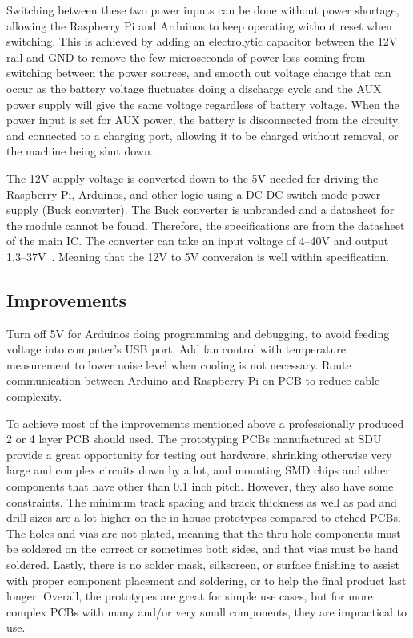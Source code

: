 \documentclass[11pt]{article}
\begin{document}
Switching between these two power inputs can be done without power shortage, allowing the Raspberry Pi and Arduinos to keep operating without reset when switching. This is achieved by adding an electrolytic capacitor between the 12V rail and GND to remove the few microseconds of power loss coming from switching between the power sources, and smooth out voltage change that can occur as the battery voltage fluctuates doing a discharge cycle and the AUX power supply will give the same voltage regardless of battery voltage. When the power input is set for AUX power, the battery is disconnected from the circuity, and connected to a charging port, allowing it to be charged without removal, or the machine being shut down.


The 12V supply voltage is converted down to the 5V needed for driving the Raspberry Pi, Arduinos, and other logic using a DC-DC switch mode power supply (Buck converter). The Buck converter is unbranded and a datasheet for the module cannot be found. Therefore, the specifications are from the datasheet of the main IC. The converter can take an input voltage of 4--40V and output 1.3--37V~\cite{LM2596-datasheet}. Meaning that the 12V to 5V conversion is well within specification. 

\subsection*{Improvements}


Turn off 5V for Arduinos doing programming and debugging, to avoid feeding voltage into computer's USB port. Add fan control with temperature measurement to lower noise level when cooling is not necessary. Route communication between Arduino and Raspberry Pi on PCB to reduce cable complexity.


To achieve most of the improvements mentioned above a professionally produced 2 or 4 layer PCB should used. The prototyping PCBs manufactured at SDU provide a great opportunity for testing out hardware, shrinking otherwise very large and complex circuits down by a lot, and mounting SMD chips and other components that have other than 0.1 inch pitch. However, they also have some constraints. The minimum track spacing and track thickness as well as pad and drill sizes are a lot higher on the in-house prototypes compared to etched PCBs. The holes and vias are not plated, meaning that the thru-hole components must be soldered on the correct or sometimes both sides, and that vias must be hand soldered. Lastly, there is no solder mask, silkscreen, or surface finishing to assist with proper component placement and soldering, or to help the final product last longer. Overall, the prototypes are great for simple use cases, but for more complex PCBs with many and/or very small components, they are impractical to use.
\end{document}
